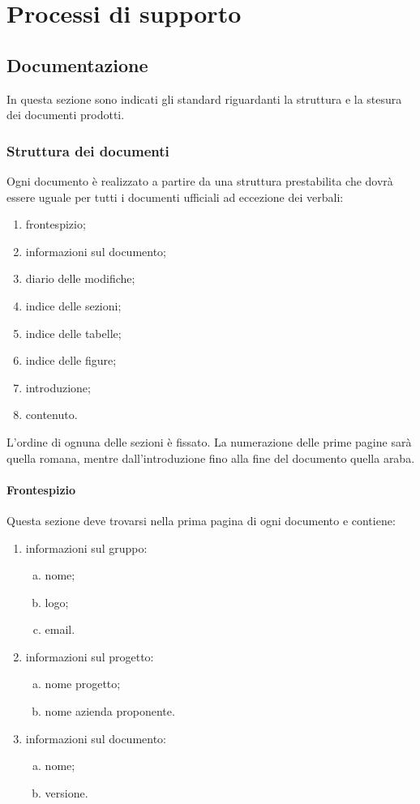 \documentclass[../NormeProgetto.tex]{subfiles}
\begin{document}
\section{Processi di supporto}
\subsection{Documentazione}
In questa sezione sono indicati gli standard riguardanti la struttura e la stesura dei documenti prodotti.
	\subsubsection{Struttura dei documenti}
		Ogni documento è realizzato a partire da una struttura prestabilita che dovrà essere uguale per tutti i documenti ufficiali ad eccezione dei verbali:
		\begin{enumerate}
			\item frontespizio;
			\item informazioni sul documento;
			\item diario delle modifiche;
			\item indice delle sezioni;
			\item indice delle tabelle;
			\item indice delle figure;
			\item introduzione;
			\item contenuto.
		\end{enumerate}
		L'ordine di ognuna delle sezioni è fissato. La numerazione delle prime pagine sarà quella romana, mentre dall'introduzione fino alla fine del documento quella araba.

		\paragraph{Frontespizio}
			Questa sezione deve trovarsi nella prima pagina di ogni documento e contiene:
			\begin{enumerate}
				\item informazioni sul gruppo:
					\begin{enumerate}[a.]
						\item nome;
						\item logo;
						\item email.
					\end{enumerate}
				\item informazioni sul progetto:
					\begin{enumerate}[a.]
						\item nome progetto;
						\item nome azienda proponente.
					\end{enumerate}
				\item informazioni sul documento:
					\begin{enumerate}[a.]
						\item nome;
						\item versione.
					\end{enumerate}
			\end{enumerate}
\end{document}
